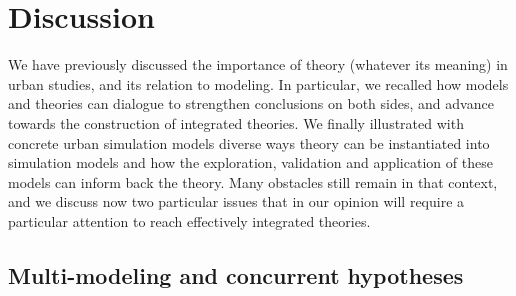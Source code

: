 \documentclass[10pt]{article}
\begin{document}
\section{Discussion}


We have previously discussed the importance of theory (whatever its meaning) in urban studies, and its relation to modeling. In particular, we recalled how models and theories can dialogue to strengthen conclusions on both sides, and advance towards the construction of integrated theories. We finally illustrated with concrete urban simulation models diverse ways theory can be instantiated into simulation models and how the exploration, validation and application of these models can inform back the theory. Many obstacles still remain in that context, and we discuss now two particular issues that in our opinion will require a particular attention to reach effectively integrated theories.


\subsection{Multi-modeling and concurrent hypotheses}
\end{document}
